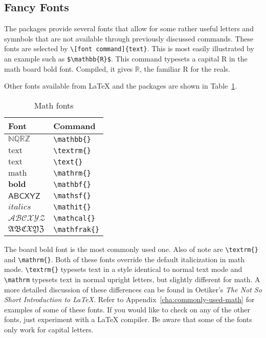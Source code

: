 \subsection{Fancy Fonts}
\label{sec:fancy-fonts}

The \AmS{} packages provide several fonts that allow for some rather
useful letters and symnbols that are not available through previously
discussed commands.  These fonts are selected by
\verb?\[font command]{text}?.  This is most easily illustrated by an
example such as \verb?$\mathbb{R}$?.  This command typesets a capital
R in the math board bold font.  Compiled, it gives $\mathbb{R}$, the
familiar R for the reals.

Other fonts available from \LaTeX{} and the \AmS{} packages are shown
in Table~\ref{tab:math-fonts}.
\begin{table}
  \centering
  \caption{Math fonts}
  \label{tab:math-fonts}
  \begin{tabular}{@{}ll@{}}
    \toprule
    Font & Command \\
    \midrule
    $\mathbb{NQRZ}$ & \verb|\mathbb{}| \\
    $\textrm{text}$ & \verb|\textrm{}| \\
    $\text{text}$ & \verb|\text{}| \\
    $\mathrm{math}$ & \verb|\mathrm{}| \\
    $\mathbf{bold}$ & \verb|\mathbf{}| \\
    $\mathsf{ABCXYZ}$ & \verb|\mathsf{}| \\
    $\mathit{italics}$ & \verb|\mathit{}| \\
    $\mathcal{ABCXYZ}$ & \verb|\mathcal{}| \\
    $\mathfrak{ABCXYZ}$ & \verb|\mathfrak{}| \\
    \bottomrule
  \end{tabular}  
\end{table}

The board bold font is the most commonly used one.  Also of note are
\verb?\textrm{}? and \verb?\mathrm{}?.  Both of these fonts override
the default italicization in math mode.  \verb?\textrm{}? typesets
text in a style identical to normal text mode and \verb?\mathrm?
typesets text in normal upright letters, but slightly different for
math.  A more detailed discussion of these differences can be found in
Oetiker's \emph{The Not So Short Introduction to \LaTeX{}}.  Refer to
Appendix~\ref{cha:commonly-used-math} for examples of some of these
fonts.  If you would like to check on any of the other fonts, just
experiment with a \LaTeX{} compiler.  Be aware that some of the fonts
only work for capital letters.

